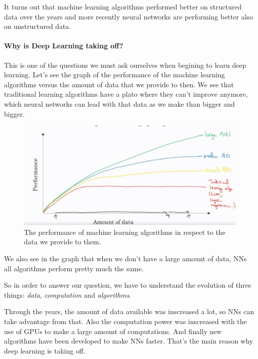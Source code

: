 \documentclass[12pt, a4paper, oneside]{book}
\begin{document}
It turns out that machine learning algorithms performed better on structured
data over the years and more recently neural networks are performing better also
on unstructured data.

\paragraph{Why is Deep Learning taking off?}%
\label{par:why_is_deep_learning_taking_off_}

This is one of the questions we must ask ourselves when begining to learn deep
learning. Let's see the graph of the performance of the machine learning
algorithms versus the amount of data that we provide to then. We see that
traditional learning algorithms have a plato where they can't improve anymore,
which neural networks can lead with that data as we make than bigger and bigger.

\begin{figure}[h]
\centering
\includegraphics[scale=0.4]{Res/ml_algorithms_performance.png}
\caption{The performance of machine learning algorithms in respect to the data
we provide to them.}
\label{ml_algorithms_performance.png}
\end{figure}

We also see in the graph that when we don't have a large amount of data, NNs
all algorithms perform pretty much the same.

So in order to answer our question, we have to understand the evolution of three
things: \textit{data}, \textit{computation} and \textit{algorithms}.

Through the years, the amount of data available was inscreased a lot, so NNs can
take advantage from that. Also the computation power was inscreased with the use
of GPUs to make a large amount of computations. And finally new algorithms have
been developed to make NNs faster. That's the main reason why deep learning is
taking off.




\end{document}
